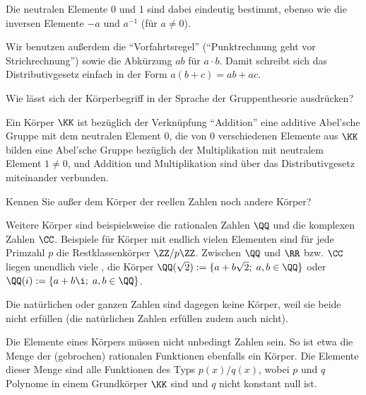\begin{antwort}
  \medskip
  \noindent
  Die neutralen Elemente 0 und 1 sind dabei eindeutig bestimmt, ebenso 
  wie die inversen Elemente $-a$ und $a^{-1}$ (für $a\not=0$).

  \medskip
  Wir benutzen außerdem die "`Vorfahrtsregel"' 
  ("`Punktrechnung geht vor Strichrechnung"') sowie 
  die Abkürzung $ab$ für $a\cdot b$. Damit schreibt sich das Distributivgesetz 
  einfach in der Form $a(b+c) = ab+ac$.\AntEnd
\end{antwort}


\begin{frage}
  Wie lässt sich der Körperbegriff in der Sprache der Gruppentheorie ausdrücken?
\end{frage}

\begin{antwort}
  Ein Körper $\KK$ ist bezüglich der Verknüpfung "`Addition"' 
  eine additive Abel'sche Gruppe mit dem neutralen Element $0$,  
  die von $0$ verschiedenen Elemente aus $\KK$ bilden eine Abel'sche 
  Gruppe bezüglich der Multiplikation mit neutralem Element $1\not=0$, 
  und Addition und Multiplikation sind über das Distributivgesetz  
  miteinander verbunden.\AntEnd
\end{antwort}


\begin{frage} 
  Kennen Sie außer dem Körper der reellen Zahlen noch andere Körper? 
\end{frage}

\begin{antwort}
  Weitere Körper sind beispielsweise die rationalen Zahlen $\QQ$ und 
  die komplexen Zahlen $\CC$. 
  Beispiele für Körper mit endlich vielen Elementen 
  sind für jede Primzahl $p$ die Restklassenkörper $\ZZ/p\ZZ$. 
  Zwischen $\QQ$ und $\RR$ bzw. $\CC$ liegen unendlich viele  
  , {\zB} die Körper
  $\QQ(\sqrt{2}):=\{ a+b\sqrt{2};\; a,b\in\QQ \}$ oder 
  $\QQ(i) := \{ a+b\i;\; a,b\in \QQ \}$.
  
  Die natürlichen oder ganzen Zahlen sind dagegen keine Körper, 
weil sie beide  nicht erfüllen (die natürlichen Zahlen erfüllen 
zudem auch  nicht).

  Die Elemente eines Körpers müssen 
  nicht unbedingt Zahlen sein. So ist etwa die Menge der (gebrochen) 
  rationalen Funktionen 
  ebenfalls ein Körper.  
  Die Elemente dieser Menge sind alle Funktionen des Typs $p(x)/q(x)$, 
  wobei $p$ und $q$ Polynome in einem Grundkörper $\KK$ sind und $q$ 
  nicht konstant null ist.
  \AntEnd
\end{antwort}

